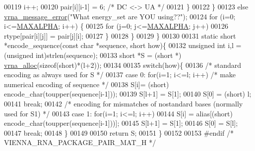 \begin{DoxyCode}
00119           i++;
00120           pair[i][i-1] = 6;    \textcolor{comment}{/* DC <-> UA */}
00121         \}
00122       \}
00123       \textcolor{keywordflow}{else} \hyperlink{group__utils_ga36b35be01d7f36cf7f59c245eee628d1}{vrna\_message\_error}(\textcolor{stringliteral}{"What energy\_set are YOU using??"});
00124       \textcolor{keywordflow}{for} (i=0; i<=\hyperlink{group__model__details_ga05a5ffe718aa431d97419a12fb082379}{MAXALPHA}; i++) \{
00125         \textcolor{keywordflow}{for} (j=0; j<=\hyperlink{group__model__details_ga05a5ffe718aa431d97419a12fb082379}{MAXALPHA}; j++)
00126           rtype[pair[i][j]] = pair[j][i];
00127       \}
00128    \}
00129 \}
00130 
00131 \textcolor{keyword}{static} \textcolor{keywordtype}{short} *encode\_sequence(\textcolor{keyword}{const} \textcolor{keywordtype}{char} *sequence, \textcolor{keywordtype}{short} how)\{
00132   \textcolor{keywordtype}{unsigned} \textcolor{keywordtype}{int} i,l = (\textcolor{keywordtype}{unsigned} int)strlen(sequence);
00133   \textcolor{keywordtype}{short}         *S = (\textcolor{keywordtype}{short} *) \hyperlink{group__utils_gaf37a0979367c977edfb9da6614eebe99}{vrna\_alloc}(\textcolor{keyword}{sizeof}(\textcolor{keywordtype}{short})*(l+2));
00134 
00135   \textcolor{keywordflow}{switch}(how)\{
00136     \textcolor{comment}{/* standard encoding as always used for S */}
00137     \textcolor{keywordflow}{case} 0:   \textcolor{keywordflow}{for}(i=1; i<=l; i++) \textcolor{comment}{/* make numerical encoding of sequence */}
00138                 S[i]= (\textcolor{keywordtype}{short}) encode\_char(toupper(sequence[i-1]));
00139               S[l+1] = S[1];
00140               S[0] = (short) l;
00141               \textcolor{keywordflow}{break};
00142     \textcolor{comment}{/* encoding for mismatches of nostandard bases (normally used for S1) */}
00143     \textcolor{keywordflow}{case} 1:   \textcolor{keywordflow}{for}(i=1; i<=l; i++)
00144                 S[i] = alias[(\textcolor{keywordtype}{short}) encode\_char(toupper(sequence[i-1]))];
00145               S[l+1] = S[1];
00146               S[0] = S[l];
00147               \textcolor{keywordflow}{break};
00148   \}
00149 
00150   \textcolor{keywordflow}{return} S;
00151 \}
00152 
00153 \textcolor{preprocessor}{#endif }\textcolor{comment}{/* VIENNA\_RNA\_PACKAGE\_PAIR\_MAT\_H */}\textcolor{preprocessor}{}
\end{DoxyCode}
